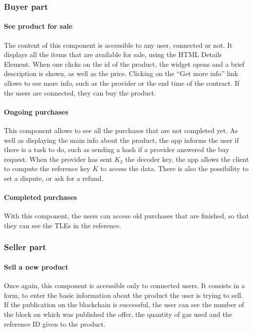 \documentclass[conference]{IEEEtran}
\begin{document}
\subsubsection{Buyer part}
\paragraph{See product for sale}
The content of this component is accessible to any user, connected or not. It displays all the items that are available for sale, using the HTML Details Element. When one clicks on the id of the product, the widget opens and a brief description is shown, as well as the price. Clicking on the ``Get more info'' link allows to see more info, such as the provider or the end time of the contract. If the users are connected, they can buy the product.

\paragraph{Ongoing purchases}
This component allows to see all the purchases that are not completed yet. As well as displaying the main info about the product, the app informs the user if there is a task to do, such as sending a hash if a provider answered the buy request. When the provider has sent $K_2$ the decoder key, the app allows the client to compute the reference key $K$ to access the data. There is also the possibility to set a dispute, or ask for a refund.

\paragraph{Completed purchases}
With this component, the users can access old purchases that are finished, so that they can see the TLEs in the reference. 

\medskip
\subsubsection{Seller part}
\paragraph{Sell a new product}
Once again, this component is accessible only to connected users. It consists in a form, to enter the basic information about the product the user is trying to sell. If the publication on the blockchain is successful, the user can see the number of the block on which was published the offer, the quantity of gas used and the reference ID given to the product.
\end{document}
